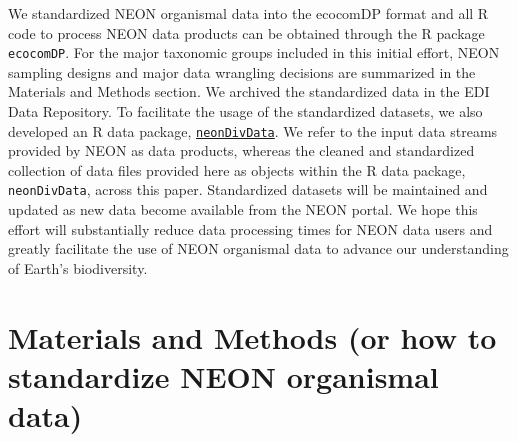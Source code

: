 \documentclass[
  12pt,
]{article}
\begin{document}
We standardized NEON organismal data into the ecocomDP format and all R code to process NEON data products can be obtained through the R package \texttt{ecocomDP}. For the major taxonomic groups included in this initial effort, NEON sampling designs and major data wrangling decisions are summarized in the Materials and Methods section. We archived the standardized data in the EDI Data Repository. To facilitate the usage of the standardized datasets, we also developed an R data package, \href{https://github.com/daijiang/neonDivData}{\texttt{neonDivData}}. We refer to the input data streams provided by NEON as data products, whereas the cleaned and standardized collection of data files provided here as objects within the R data package, \texttt{neonDivData}, across this paper. Standardized datasets will be maintained and updated as new data become available from the NEON portal. We hope this effort will substantially reduce data processing times for NEON data users and greatly facilitate the use of NEON organismal data to advance our understanding of Earth's biodiversity.

\hypertarget{materials-and-methods-or-how-to-standardize-neon-organismal-data}{%
\section{Materials and Methods (or how to standardize NEON organismal data)}\label{materials-and-methods-or-how-to-standardize-neon-organismal-data}}
\end{document}
